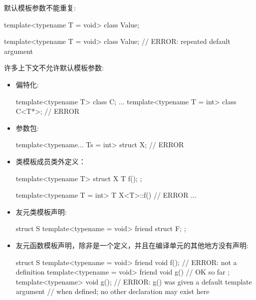 默认模板参数不能重复:

\begin{cpp}
template<typename T = void>
class Value;

template<typename T = void>
class Value; // ERROR: repeated default argument
\end{cpp}

许多上下文不允许默认模板参数:

\begin{itemize}
\item 
偏特化:

\begin{cpp}
template<typename T>
class C;
...
template<typename T = int>
class C<T*>; // ERROR
\end{cpp}

\item 
参数包:

\begin{cpp}
template<typename... Ts = int> struct X; // ERROR
\end{cpp}

\item 
类模板成员类外定义：

\begin{cpp}
template<typename T> struct X
{
	T f();
};

template<typename T = int> T X<T>::f() { // ERROR
	...
}
\end{cpp}

\item 
友元类模板声明:

\begin{cpp}
struct S {
	template<typename = void> friend struct F;
};
\end{cpp}

\item 
友元函数模板声明，除非是一个定义，并且在编译单元的其他地方没有声明:

\begin{cpp}
struct S {
	template<typename = void> friend void f(); // ERROR: not a definition
	template<typename = void> friend void g() { // OK so far
	}
};
template<typename> void g(); // ERROR: g() was given a default template argument
// when defined; no other declaration may exist here
\end{cpp}

\end{itemize}















